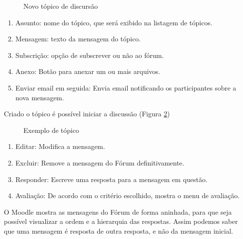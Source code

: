  \begin{figure}[!htbp]
 \begin{center}
  \caption{Novo tópico de discursão}
  \label{fig:cap5_47}
 \end{center}
\end{figure}

\begin{enumerate}
\item Assunto: nome do tópico, que será exibido na listagem de tópicos.
\item Mensagem: texto da mensagem do tópico.
\item Subscrição: opção de subscrever ou não ao fórum.
\item Anexo: Botão para anexar um ou mais arquivos.
\item Enviar email em seguida: Envia email notificando os participantes sobre a nova mensagem.
\end{enumerate}

Criado o tópico é possível iniciar a discussão (Figura \ref{fig:cap5_48})

 \begin{figure}[!htbp]
 \begin{center}
  \caption{Exemplo de tópico}
  \label{fig:cap5_48}
 \end{center}
\end{figure}
\begin{enumerate}
\item Editar: Modifica a mensagem.
\item Excluir: Remove a mensagem do Fórum definitivamente.
\item Responder: Escreve uma resposta para a mensagem em questão.
\item Avaliação: De acordo com o critério escolhido, mostra o menu de avaliação.
\end{enumerate}
O Moodle mostra as mensagens do Fórum de forma aninhada, para que seja possível visualizar a ordem e a hierarquia das respostas. Assim podemos saber que uma mensagem é resposta de outra resposta, e não da mensagem inicial.


